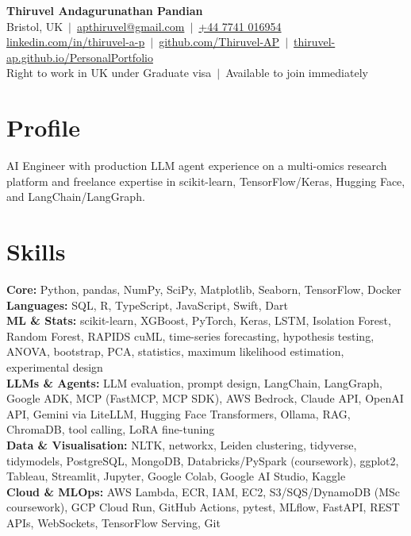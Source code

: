 \documentclass[a4paper,11pt]{article}
\begin{document}
\fontsize{11}{13.2}\selectfont

\begin{center}
  {\LARGE\bfseries Thiruvel Andagurunathan Pandian}\\[3pt]
  Bristol, UK \,$|$\, \href{mailto:apthiruvel@gmail.com}{apthiruvel@gmail.com} \,$|$\, \href{tel:+447741016954}{+44 7741 016954}\\[1pt]
\href{https://www.linkedin.com/in/thiruvel-a-p/}{linkedin.com/in/thiruvel-a-p} \,$|$\, \href{https://github.com/Thiruvel-AP}{github.com/Thiruvel-AP} \,$|$\, \href{https://thiruvel-ap.github.io/PersonalPortfolio/}{thiruvel-ap.github.io/PersonalPortfolio}\\[1pt]
  Right to work in UK under Graduate visa \,$|$\, Available to join immediately
\end{center}

\section{Profile}
AI Engineer with production LLM agent experience on a multi-omics research platform and freelance expertise in scikit-learn, TensorFlow/Keras, Hugging Face, and LangChain/LangGraph.

\section{Skills}
\textbf{Core:} Python, pandas, NumPy, SciPy, Matplotlib, Seaborn, TensorFlow, Docker\\[2pt]
\textbf{Languages:} SQL, R, TypeScript, JavaScript, Swift, Dart\\[2pt]
\textbf{ML \& Stats:} scikit-learn, XGBoost, PyTorch, Keras, LSTM, Isolation Forest, Random Forest, RAPIDS cuML, time-series forecasting, hypothesis testing, ANOVA, bootstrap, PCA, statistics, maximum likelihood estimation, experimental design\\[2pt]
\textbf{LLMs \& Agents:} LLM evaluation, prompt design, LangChain, LangGraph, Google ADK, MCP (FastMCP, MCP SDK), AWS Bedrock, Claude API, OpenAI API, Gemini via LiteLLM, Hugging Face Transformers, Ollama, RAG, ChromaDB, tool calling, LoRA fine-tuning\\[2pt]
\textbf{Data \& Visualisation:} NLTK, networkx, Leiden clustering, tidyverse, tidymodels, PostgreSQL, MongoDB, Databricks/PySpark (coursework), ggplot2, Tableau, Streamlit, Jupyter, Google Colab, Google AI Studio, Kaggle\\[2pt]
\textbf{Cloud \& MLOps:} AWS Lambda, ECR, IAM, EC2, S3/SQS/DynamoDB (MSc coursework), GCP Cloud Run, GitHub Actions, pytest, MLflow, FastAPI, REST APIs, WebSockets, TensorFlow Serving, Git
\end{document}
